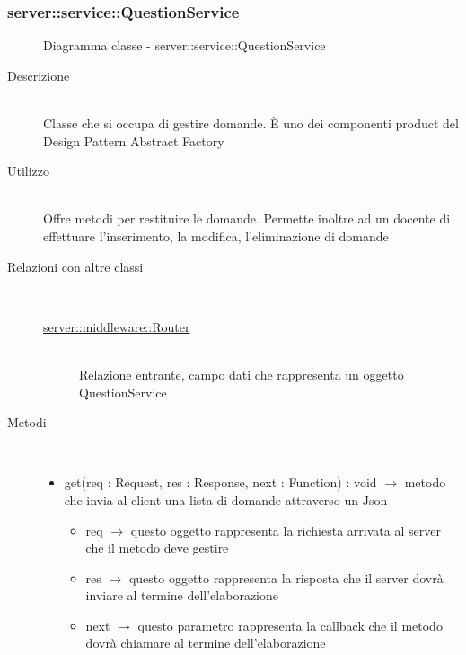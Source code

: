 \subsubsection[QuestionService]{server::service::QuestionService}
\begin{figure}[H]
	\centering
	\caption{Diagramma classe - server::service::QuestionService}
\end{figure}\begin{description}
\item[Descrizione] \hfill \\
Classe che si occupa di gestire domande. È uno dei componenti product del Design Pattern Abstract Factory
\item[Utilizzo] \hfill \\
Offre metodi per restituire le domande. Permette inoltre ad un docente di effettuare l'inserimento, la modifica, l'eliminazione di domande
\item[Relazioni con altre classi] \hfill \\
\vspace{-7mm}
\begin{description}
	\item[\hyperlink{server::middleware::Router}{server::middleware::Router}] \hfill \\
	Relazione entrante, campo dati che rappresenta un oggetto QuestionService
\end{description}

\item[Metodi] \hfill \\
\vspace{-7mm}
\begin{itemize}
	\item get(req : Request, res : Response, next : Function) : void $\rightarrow$ metodo che invia al client una lista di domande attraverso un Json\begin{itemize}
		\item req $\rightarrow$ questo oggetto rappresenta la richiesta arrivata al server che il metodo deve gestire
		\item res $\rightarrow$ questo oggetto rappresenta la risposta che il server dovrà inviare al termine dell'elaborazione
		\item next $\rightarrow$ questo parametro rappresenta la callback che il metodo dovrà chiamare al termine dell'elaborazione
	\end{itemize}
	

\end{itemize}
\end{description}
